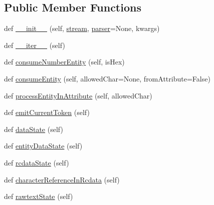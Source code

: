 \subsection*{Public Member Functions}
\begin{DoxyCompactItemize}
\item 
def \hyperlink{classpip_1_1__vendor_1_1html5lib_1_1__tokenizer_1_1HTMLTokenizer_a37e9cde791867f4012bb06cfdb96aadb}{\+\_\+\+\_\+init\+\_\+\+\_\+} (self, \hyperlink{classpip_1_1__vendor_1_1html5lib_1_1__tokenizer_1_1HTMLTokenizer_a14fd3385f40bd47bb5ddfa797260198c}{stream}, \hyperlink{classpip_1_1__vendor_1_1html5lib_1_1__tokenizer_1_1HTMLTokenizer_a10008df5f350b336a2afe9394379592f}{parser}=None, kwargs)
\item 
def \hyperlink{classpip_1_1__vendor_1_1html5lib_1_1__tokenizer_1_1HTMLTokenizer_a85854b2f4e513947aa984a4a5f32ffd1}{\+\_\+\+\_\+iter\+\_\+\+\_\+} (self)
\item 
def \hyperlink{classpip_1_1__vendor_1_1html5lib_1_1__tokenizer_1_1HTMLTokenizer_a2f68fca6b9812d733ec6bb83ffb12afd}{consume\+Number\+Entity} (self, is\+Hex)
\item 
def \hyperlink{classpip_1_1__vendor_1_1html5lib_1_1__tokenizer_1_1HTMLTokenizer_a13e1e65dd097cb582d5e7e0f364562ea}{consume\+Entity} (self, allowed\+Char=None, from\+Attribute=False)
\item 
def \hyperlink{classpip_1_1__vendor_1_1html5lib_1_1__tokenizer_1_1HTMLTokenizer_a5d9b0344c3beca7c36219ebe38aca000}{process\+Entity\+In\+Attribute} (self, allowed\+Char)
\item 
def \hyperlink{classpip_1_1__vendor_1_1html5lib_1_1__tokenizer_1_1HTMLTokenizer_a2764bdec69294eb88309e2f12a9bb6df}{emit\+Current\+Token} (self)
\item 
def \hyperlink{classpip_1_1__vendor_1_1html5lib_1_1__tokenizer_1_1HTMLTokenizer_affad458a1ca066c41bcd58d57b489c4a}{data\+State} (self)
\item 
def \hyperlink{classpip_1_1__vendor_1_1html5lib_1_1__tokenizer_1_1HTMLTokenizer_af78047999ff55f9b2d17a1c5e4530657}{entity\+Data\+State} (self)
\item 
def \hyperlink{classpip_1_1__vendor_1_1html5lib_1_1__tokenizer_1_1HTMLTokenizer_a3cdbde5d29a6a715b879d3d0fa657a7f}{rcdata\+State} (self)
\item 
def \hyperlink{classpip_1_1__vendor_1_1html5lib_1_1__tokenizer_1_1HTMLTokenizer_a84cf03462ee9ff57aed975fbb6a939a6}{character\+Reference\+In\+Rcdata} (self)
\item 
def \hyperlink{classpip_1_1__vendor_1_1html5lib_1_1__tokenizer_1_1HTMLTokenizer_ab1bb5e7c93edcd518178631af1f3f398}{rawtext\+State} (self)

\end{DoxyCompactItemize}
